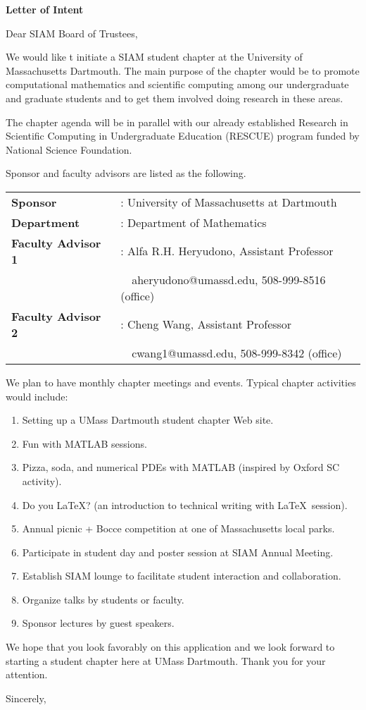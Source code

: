 \documentclass[letterpaper,12pt]{letter}
\begin{document}
\begin{letter}{\textbf{Letter of Intent}}

\opening{Dear SIAM Board of Trustees,}

We would like t initiate a SIAM student chapter at the University of Massachusetts Dartmouth. The main purpose of the chapter would be to promote computational mathematics and scientific computing among our undergraduate and graduate students and to get them involved doing research in these areas.

The chapter agenda will be in parallel with our already established Research in Scientific Computing in Undergraduate Education (RESCUE) program funded by National Science Foundation.

Sponsor and faculty advisors are listed as the following.

\begin{tabular}{ll}
\textbf{Sponsor} &: University of Massachusetts at Dartmouth \\
\textbf{Department} &: Department of Mathematics \\
\textbf{Faculty Advisor 1} &: Alfa R.H. Heryudono, Assistant Professor \\
&\ \ aheryudono@umassd.edu, 508-999-8516 (office) \\
\textbf{Faculty Advisor 2} &: Cheng Wang, Assistant Professor \\
&\ \ cwang1@umassd.edu, 508-999-8342 (office) \\
\end{tabular}

We plan to have monthly chapter meetings and events. Typical chapter activities would include:
\begin{enumerate}
\item Setting up a UMass Dartmouth student chapter Web site.
\item Fun with \textsc{MATLAB} sessions.
\item Pizza, soda, and numerical PDEs with \textsc{MATLAB} (inspired by Oxford SC activity).
\item Do you \LaTeX ? (an introduction to technical writing with \LaTeX\ session).
\item Annual picnic + Bocce competition at one of Massachusetts local parks.
\newpage
\item Participate in student day and poster session at SIAM Annual Meeting.
\item Establish SIAM lounge to facilitate student interaction and collaboration.
\item Organize talks by students or faculty.
\item Sponsor lectures by guest speakers.
\end{enumerate}

We hope that you look favorably on this application and we look forward to starting a student chapter here at UMass Dartmouth. Thank you for your attention.

\closing{Sincerely,}

\end{letter}
\end{document}
